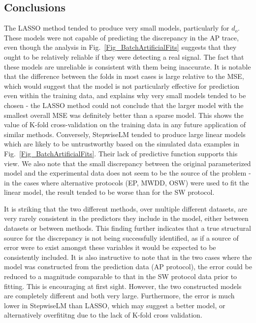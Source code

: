 \documentclass[11pt,a4paper,oneside]{article}
\begin{document}
\subsection{Conclusions}

The LASSO method tended to produce very small models, particularly for $d_o$. These models were not capable of predicting the discrepancy in the AP trace, even though the analysis in Fig.~\ref{Fig_BatchArtificialFits} suggests that they ought to be relatively reliable if they were detecting a real signal. The fact that these models are unreliable is consistent with them being inaccurate. It is notable that the difference between the folds in most cases is large relative to the MSE, which would suggest that the model is not particularly effective for prediction even within the training data, and explains why very small models tended to be chosen - the LASSO method could not conclude that the larger model with the smallest overall MSE was definitely better than a sparse model. This shows the value of K-fold cross-validation on the training data in any future application of similar methods. Conversely, StepwiseLM tended to produce large linear models which are likely to be untrustworthy based on the simulated data examples in Fig.~\ref{Fig_BatchArtificialFits}. Their lack of predictive function supports this view. We also note that the small discrepancy between the original parameterized model and the experimental data does not seem to be the source of the problem - in the cases where alternative protocols (EP, MWDD, OSW) were used to fit the linear model, the result tended to be worse than for the SW protocol.

It is striking that the two different methods, over multiple different datasets, are very rarely consistent in the predictors they include in the model, either between datasets or between methods. This finding further indicates that a true structural source for the discrepancy is not being successfully identified, as if a source of error were to exist amongst these variables it would be expected to be consistently included. It is also instructive to note that in the two cases where the model was constructed from the prediction data (AP protocol), the error could be reduced to a magnitude comparable to that in the SW protocol data prior to fitting. This is encouraging at first sight. However, the two constructed models are completely different and both very large. Furthermore, the error is much lower in StepwiseLM than LASSO, which may suggest a better model, or alternatively overfititng due to the lack of K-fold cross validation.
\end{document}
